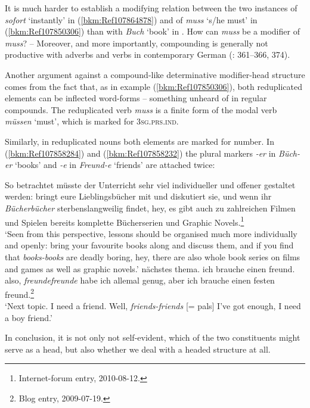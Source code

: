 \documentclass[output=paper
  ,nobabel
  ,draftmode
  ,colorlinks, citecolor=brown
]{langscibook}
\begin{document}
\noindent
It is much harder to establish a modifying relation between the two instances of \emph{sofort}
`instantly' in (\ref{bkm:Ref107864878}) and of \emph{muss} `s/he must' in (\ref{bkm:Ref107850306})
than with \emph{Buch} `book' in . How can \emph{muss} be a modifier of \emph{muss}?
– Moreover, and more importantly, compounding is generally not productive with adverbs and verbs
in contemporary German (\citealt{FleischerBarz2012}: 361–366, 374).

Another argument against a compound-like determinative modifier-head structure comes from the fact
that, as in example (\ref{bkm:Ref107850306}), both reduplicated elements can be inflected word-forms
– something unheard of in regular compounds. The reduplicated verb \emph{muss} is a finite form of
the modal verb \emph{müssen} `must', which is marked for 3\textsc{sg.prs.ind}.

Similarly, in reduplicated nouns both elements are marked for number. In (\ref{bkm:Ref107858284})
and (\ref{bkm:Ref107858232}) the plural markers \emph{-er} in \emph{Büch-er} `books' and
\emph{-e} in \emph{Freund-e} `friends' are attached twice:



\ea
\label{bkm:Ref107858284}%
So betrachtet müsste der Unterricht sehr viel individueller und offener gestaltet werden: bringt eure Lieblingsbücher mit und diskutiert sie, und wenn ihr \emph{Bücherbücher} sterbenslangweilig findet, hey, es gibt auch zu zahlreichen Filmen und Spielen bereits komplette Bücherserien und Graphic Novels.\footnote{Internet-forum entry, 2010-08-12.}\\
`Seen from this perspective, lessons should be organised much more individually and openly: bring your favourite books along and discuss them, and if you find that \emph{books-books} are deadly boring, hey, there are also whole book series on films and games as well as graphic novels.'
\z
\ea
\label{bkm:Ref107858232}%
nächstes thema. ich brauche einen freund. also, \emph{freundefreunde} habe ich allemal genug, aber ich brauche einen festen freund.\footnote{
Blog entry, 2009-07-19.}\\
`Next topic. I need a friend. Well, \emph{friends-friends} [= pals] I've got enough, I need a boy friend.'
\z

\noindent
In conclusion, it is not only not self-evident, which of the two constituents might serve as a head,
but also whether we deal with a headed structure at all.
\end{document}
